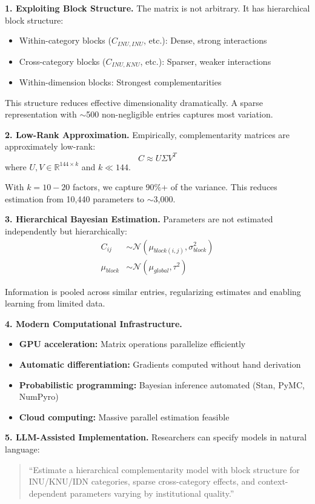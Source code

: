 \textbf{1. Exploiting Block Structure.}
The matrix is not arbitrary. It has hierarchical block structure:
\begin{itemize}
  \item Within-category blocks ($C_{INU,INU}$, etc.): Dense, strong interactions
  \item Cross-category blocks ($C_{INU,KNU}$, etc.): Sparser, weaker interactions
  \item Within-dimension blocks: Strongest complementarities
\end{itemize}

This structure reduces effective dimensionality dramatically.
A sparse representation with $\sim$500 non-negligible entries captures most variation.

\textbf{2. Low-Rank Approximation.}
Empirically, complementarity matrices are approximately low-rank:
\begin{equation}
  C \approx U \Sigma V^T
\end{equation}
where $U, V \in \mathbb{R}^{144 \times k}$ and $k \ll 144$.

With $k = 10-20$ factors, we capture 90\%+ of the variance.
This reduces estimation from 10,440 parameters to $\sim$3,000.

\textbf{3. Hierarchical Bayesian Estimation.}
Parameters are not estimated independently but hierarchically:
\begin{align}
  C_{ij} &\sim \mathcal{N}(\mu_{block(i,j)}, \sigma^2_{block}) \\
  \mu_{block} &\sim \mathcal{N}(\mu_{global}, \tau^2)
\end{align}

Information is pooled across similar entries, regularizing estimates
and enabling learning from limited data.

\textbf{4. Modern Computational Infrastructure.}
\begin{itemize}
  \item \textbf{GPU acceleration:} Matrix operations parallelize efficiently
  \item \textbf{Automatic differentiation:} Gradients computed without hand derivation
  \item \textbf{Probabilistic programming:} Bayesian inference automated (Stan, PyMC, NumPyro)
  \item \textbf{Cloud computing:} Massive parallel estimation feasible
\end{itemize}

\textbf{5. LLM-Assisted Implementation.}
Researchers can specify models in natural language:
\begin{quote}
``Estimate a hierarchical complementarity model with block structure
for INU/KNU/IDN categories, sparse cross-category effects,
and context-dependent parameters varying by institutional quality.''
\end{quote}

